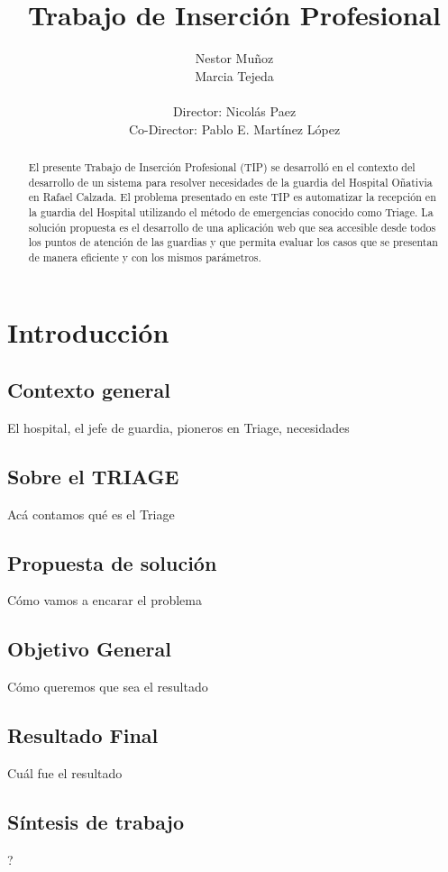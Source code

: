\documentclass[a4paper,10pt]{article}
\title{Trabajo de Inserción Profesional}
\author{Nestor Muñoz\\ Marcia Tejeda\\ \\ Director: Nicolás Paez \\  Co-Director: Pablo E. Martínez López}
\begin{document}
\maketitle
\newpage 
\begin{abstract}
El presente Trabajo de Inserción Profesional (TIP) se desarrolló en el contexto del desarrollo de un sistema para resolver necesidades de la guardia del Hospital Oñativia en Rafael Calzada.
\linebreak 
El problema presentado en este TIP es automatizar la recepción en la guardia del Hospital utilizando el método de emergencias conocido como Triage. 
\linebreak 
La solución propuesta es el desarrollo de una aplicación web que sea accesible desde todos los puntos de atención de las guardias y que permita evaluar los casos que se presentan de manera eficiente y con los mismos parámetros.

\end{abstract}


\newpage 
\tableofcontents


\newpage 
\section{Introducción}
\subsection{Contexto general}
El hospital, el jefe de guardia, pioneros en Triage, necesidades
\subsection{Sobre el TRIAGE}
Acá contamos qué es el Triage
\subsection{Propuesta de solución}
Cómo vamos a encarar el problema
\subsection{Objetivo General}
Cómo queremos que sea el resultado
\subsection{Resultado Final}
Cuál fue el resultado
\subsection{Síntesis de trabajo}
?
\end{document}
